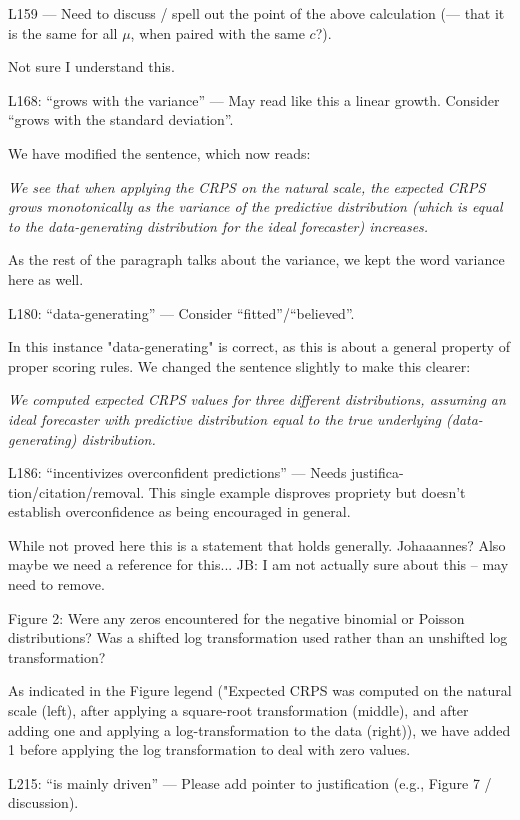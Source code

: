 \documentclass{article}
\newcommand{\red}{\color{red}}
\newcommand{\black}{\color{black}}
\newcommand{\blue}{\color{blue}}
\begin{document}
\red
L159 — Need to discuss / spell out the point of the above calculation (— that it is the same for all $\mu$, when paired with the same $c$?).

\black
Not sure I understand this. 

\blue
L168: “grows with the variance” — May read like this a linear growth. Consider “grows with the standard deviation”.

\black
We have modified the sentence, which now reads: 

\textit{We see that when applying the CRPS on the natural scale, the expected CRPS grows monotonically as the variance of the predictive distribution (which is equal to the data-generating distribution for the ideal forecaster) increases.}

As the rest of the paragraph talks about the variance, we kept the word variance here as well. 

\blue

L180: “data-generating” — Consider “fitted”/“believed”.

\black
In this instance "data-generating" is correct, as this is about a general property of proper scoring rules. We changed the sentence slightly to make this clearer: 

\textit{We computed expected CRPS values  for three different distributions, assuming an ideal forecaster with predictive distribution equal to the true underlying (data-generating) distribution.}

\red
L186: “incentivizes overconfident predictions” — Needs justifica- tion/citation/removal. This single example disproves propriety but doesn’t establish overconfidence as being encouraged in general.

\black
While not proved here this is a statement that holds generally. Johaaannes? Also maybe we need a reference for this... JB: I am not actually sure about this -- may need to remove.

\red
Figure 2: Were any zeros encountered for the negative binomial or Poisson distributions? Was a shifted log transformation used rather than an unshifted log transformation?

\black 
As indicated in the Figure legend ("Expected CRPS was computed on the natural scale (left), after applying a square-root transformation (middle), and after adding one and applying a log-transformation to the data (right)), we have added 1 before applying the log transformation to deal with zero values. 


\red
L215: “is mainly driven” — Please add pointer to justification (e.g., Figure 7 / discussion).
\end{document}
